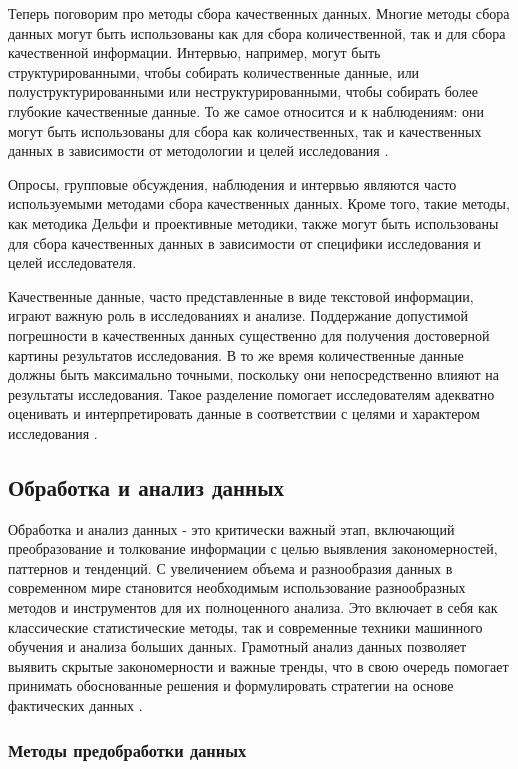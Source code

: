 Теперь поговорим про методы сбора качественных данных.
Многие методы сбора данных могут быть использованы как для сбора количественной, так и для сбора качественной информации. Интервью, например, могут быть структурированными, чтобы собирать количественные данные, или полуструктурированными или неструктурированными, чтобы собирать более глубокие качественные данные. То же самое относится и к наблюдениям: они могут быть использованы для сбора как количественных, так и качественных данных в зависимости от методологии и целей исследования .

Опросы, групповые обсуждения, наблюдения и интервью являются часто используемыми методами сбора качественных данных. Кроме того, такие методы, как методика Дельфи и проективные методики, также могут быть использованы для сбора качественных данных в зависимости от специфики исследования и целей исследователя.

Качественные данные, часто представленные в виде текстовой информации, играют важную роль в исследованиях и анализе. Поддержание допустимой погрешности в качественных данных существенно для получения достоверной картины результатов исследования. В то же время количественные данные должны быть максимально точными, поскольку они непосредственно влияют на результаты исследования. Такое разделение помогает исследователям адекватно оценивать и интерпретировать данные в соответствии с целями и характером исследования .


\subsection{Обработка и анализ данных}

Обработка и анализ данных - это критически важный этап, включающий преобразование и толкование информации с целью выявления закономерностей, паттернов и тенденций. С увеличением объема и разнообразия данных в современном мире становится необходимым использование разнообразных методов и инструментов для их полноценного анализа. Это включает в себя как классические статистические методы, так и современные техники машинного обучения и анализа больших данных. Грамотный анализ данных позволяет выявить скрытые закономерности и важные тренды, что в свою очередь помогает принимать обоснованные решения и формулировать стратегии на основе фактических данных .

\subsubsection{Методы предобработки данных}

